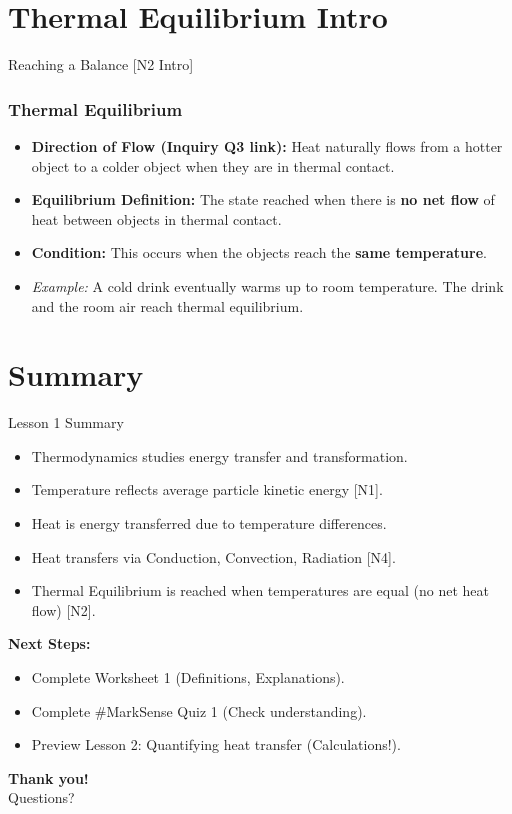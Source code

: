 \documentclass[xcolor=svgnames]{beamer}
\begin{document}
\section{Thermal Equilibrium Intro}
\begin{frame}{Reaching a Balance [N2 Intro]}
    \frametitle{Thermal Equilibrium}
    \begin{itemize}
        \item \textbf{Direction of Flow (Inquiry Q3 link):} Heat naturally flows from a hotter object to a colder object when they are in thermal contact.
        \item \textbf{Equilibrium Definition:} The state reached when there is \textbf{no net flow} of heat between objects in thermal contact.
        \item \textbf{Condition:} This occurs when the objects reach the \textbf{same temperature}.
        \item \textit{Example:} A cold drink eventually warms up to room temperature. The drink and the room air reach thermal equilibrium.
    \end{itemize}
    \begin{center}
    \end{center}
\end{frame}

\section{Summary}
\begin{frame}{Lesson 1 Summary}
    \begin{itemize}
        \item Thermodynamics studies energy transfer and transformation.
        \item Temperature reflects average particle kinetic energy [N1].
        \item Heat is energy transferred due to temperature differences.
        \item Heat transfers via Conduction, Convection, Radiation [N4].
        \item Thermal Equilibrium is reached when temperatures are equal (no net heat flow) [N2].
    \end{itemize}
    \vspace{1em}
    \textbf{Next Steps:}
    \begin{itemize}
        \item Complete Worksheet 1 (Definitions, Explanations).
        \item Complete \#MarkSense Quiz 1 (Check understanding).
        \item Preview Lesson 2: Quantifying heat transfer (Calculations!).
    \end{itemize}
\end{frame}

\begin{frame}
    \centering
    \textbf{Thank you!}\\
    Questions?
\end{frame}
\end{document}
